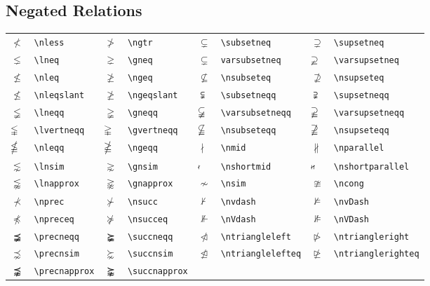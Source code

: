\documentclass[10pt, english]{article}
\begin{document}
	\subsection{Negated Relations}

	\begin{center}
		\scriptsize
	\begin{tabular}{ll|ll|ll|ll}
		$\nless$ & \verb|\nless| & $\ngtr$ & \verb|\ngtr| & $\subsetneq$ & \verb|\subsetneq| & $\supsetneq$ & \verb|\supsetneq| \\
		$\lneq$ & \verb|\lneq| & $\gneq$ & \verb|\gneq| & $\varsubsetneq$ & \verb|varsubsetneq| & $\varsupsetneq$ & \verb|\varsupsetneq| \\
		$\nleq$ & \verb|\nleq| & $\ngeq$ & \verb|\ngeq| & $\nsubseteq$ & \verb|\nsubseteq| & $\nsupseteq$ & \verb|\nsupseteq| \\
		$\nleqslant$ & \verb|\nleqslant| & $\ngeqslant$ & \verb|\ngeqslant| & $\subsetneqq$ & \verb|\subsetneqq| & $\supsetneqq$ & \verb|\supsetneqq| \\
		$\lneqq$ & \verb|\lneqq| & $\gneqq$ & \verb|\gneqq| & $\varsubsetneqq$ & \verb|\varsubsetneqq| & $\varsupsetneqq$ & \verb|\varsupsetneqq| \\
		$\lvertneqq$ & \verb|\lvertneqq| & $\gvertneqq$ & \verb|\gvertneqq| & $\nsubseteqq$ & \verb|\nsubseteqq| & $\nsupseteqq$ & \verb|\nsupseteqq| \\
		$\nleqq$ & \verb|\nleqq| & $\ngeqq$ & \verb|\ngeqq| & $\nmid$ & \verb|\nmid| & $\nparallel$ & \verb|\nparallel| \\
		$\lnsim$ & \verb|\lnsim| & $\gnsim$ & \verb|\gnsim| & $\nshortmid$ & \verb|\nshortmid| & $\nshortparallel$ & \verb|\nshortparallel| \\
		$\lnapprox$ & \verb|\lnapprox| & $\gnapprox$ & \verb|\gnapprox| & $\nsim$ & \verb|\nsim| & $\ncong$ & \verb|\ncong| \\
		$\nprec$ & \verb|\nprec| & $\nsucc$ & \verb|\nsucc| & $\nvdash$ & \verb|\nvdash| & $\nvDash$ & \verb|\nvDash| \\
		$\npreceq$ & \verb|\npreceq| & $\nsucceq$ & \verb|\nsucceq| & $\nVdash$ & \verb|\nVdash| & $\nVDash$ & \verb|\nVDash| \\
		$\precneqq$ & \verb|\precneqq| & $\succneqq$ & \verb|\succneqq| & $\ntriangleleft$ & \verb|\ntriangleleft| & $\ntriangleright$ & \verb|\ntriangleright| \\
		$\precnsim$ & \verb|\precnsim| & $\succnsim$ & \verb|\succnsim| & $\ntrianglelefteq$ & \verb|\ntrianglelefteq| & $\ntrianglerighteq$ & \verb|\ntrianglerighteq| \\
		$\precnapprox$ & \verb|\precnapprox| & $\succnapprox$ & \verb|\succnapprox| & \\
	\end{tabular}
	\end{center}
\end{document}
